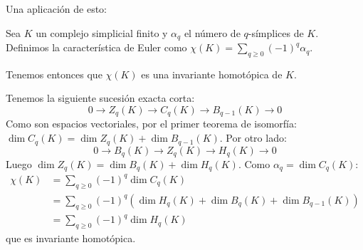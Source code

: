 \documentclass[HS.tex]{subfiles}
\begin{document}
Una aplicación de esto:
\begin{consec}
Sea $K$ un complejo simplicial finito y $\alpha_q$ el número de $q$-símplices de $K$.
Definimos la característica de Euler como $\chi(K) = \sum_{q \geq 0} (-1)^q \alpha_q$.

Tenemos entonces que $\chi(K)$ es una invariante homotópica de $K$.
\end{consec}
\begin{dem}
Tenemos la siguiente sucesión exacta corta:
\[ 0 \to Z_q(K) \to C_q(K) \to B_{q-1}(K) \to 0\]
Como son espacios vectoriales, por el primer teorema de isomorfía: $\dim C_q(K) = \dim Z_q(K) + \dim B_{q-1}(K)$.
Por otro lado:
\[ 0 \to B_q(K) \to Z_q(K) \to H_q(K) \to 0\]
Luego $\dim Z_q(K) = \dim B_q(K) + \dim H_q(K)$.
Como $\alpha_q = \dim C_q(K)$:
\begin{align*}
\chi(K) & = \sum_{q \geq 0} (-1)^q \dim C_q(K)\\
 & = \sum_{q \geq 0} (-1)^q \left(\dim H_q(K) + \dim B_q(K) + \dim B_{q-1}(K)\right)\\
 & = \sum_{q \geq 0} (-1)^q \dim H_q(K)
\end{align*}
que es invariante homotópica. \QED
\end{dem}
\end{document}
